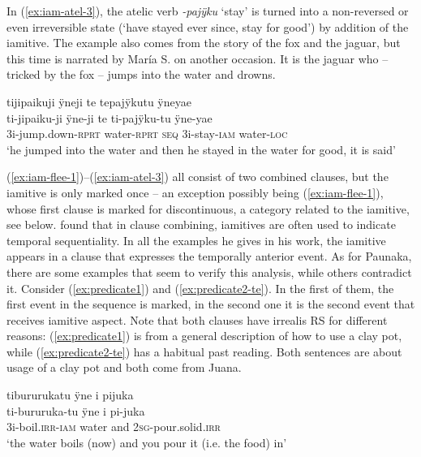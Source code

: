 In (\ref{ex:iam-atel-3}), the atelic verb \textit{-pajÿku} ‘stay’ is turned into a non-reversed or even irreversible state (‘have stayed ever since, stay for good’) by addition of the iamitive. The example also comes from the story of the fox and the jaguar, but this time is narrated by María S. on another occasion. It is the jaguar who – tricked by the fox – jumps into the water and drowns. 

\ea\label{ex:iam-atel-3}
\begingl
\glpreamble tijipaikuji ÿneji te tepajÿkutu ÿneyae\\
\gla ti-jipaiku-ji ÿne-ji te ti-pajÿku-tu ÿne-yae\\
\glb 3i-jump.down-\textsc{rprt} water-\textsc{rprt} \textsc{seq} 3i-stay-\textsc{iam} water-\textsc{loc}\\
\glft ‘he jumped into the water and then he stayed in the water for good, it is said’
\endgl
\trailingcitation{[rxx-n120511l-1.039]}
\xe


(\ref{ex:iam-flee-1})--(\ref{ex:iam-atel-3}) all consist of two combined clauses, but the iamitive is only marked once – an exception possibly being (\ref{ex:iam-flee-1}), whose first clause is marked for discontinuous, a category related to the iamitive, see  below. \citet[39]{Olsson2013} found that in clause combining, iamitives are often used to indicate temporal sequentiality. In all the examples he gives in his work, the iamitive appears in a clause that expresses the temporally anterior event. As for Paunaka, there are some examples that seem to verify this analysis, while others contradict it. Consider (\ref{ex:predicate1}) and (\ref{ex:predicate2-te}). In the first of them, the first event in the sequence is marked, in the second one it is the second event that receives iamitive aspect. 
Note that both clauses have irrealis RS for different reasons: (\ref{ex:predicate1}) is from a general description of how to use a clay pot, while (\ref{ex:predicate2-te}) has a habitual past reading. Both sentences are about usage of a clay pot and both come from Juana.

\ea\label{ex:predicate1}
\begingl 
\glpreamble tibururukatu ÿne i pijuka\\
\gla ti-bururuka-tu ÿne i pi-juka\\ 
\glb 3i-boil.\textsc{irr}-\textsc{iam} water and 2\textsc{sg}-pour.solid.\textsc{irr}\\ 
\glft ‘the water boils (now) and you pour it (i.e. the food) in’\\ 
\endgl
\trailingcitation{[jxx-d110923l-3]}
\xe

